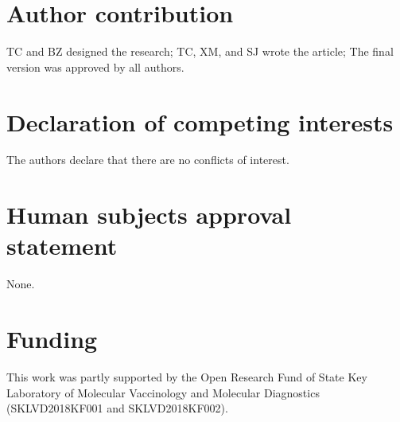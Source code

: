 \documentclass[8pt,twocolumn]{extarticle}
\begin{document}
\section{Author contribution}
TC and BZ designed the research; TC, XM, and SJ wrote the article; The final version was approved by all authors.

\section{Declaration of competing interests}
The authors declare that there are no conflicts of interest.

\section{Human subjects approval statement}
None.

\section{Funding}
This work was partly supported by the Open Research Fund of State Key Laboratory of Molecular Vaccinology and Molecular Diagnostics (SKLVD2018KF001 and SKLVD2018KF002).



\end{document}
